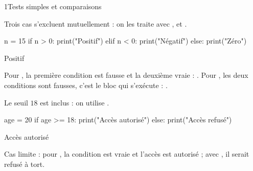 
\corrigesSouples

\begin{corrige}{1}{Tests simples et comparaisons}
\begin{questions}
  \item Trois cas s'excluent mutuellement : on les traite avec ,  et .
\begin{codecote}
\begin{pythoncol}
n = 15
if n > 0:
    print("Positif")
elif n < 0:
    print("Négatif")
else:
    print("Zéro")
\end{pythoncol}
\cote
\begin{consolecol}
Positif
\end{consolecol}
\end{codecote}
    Pour , la première condition est fausse et la deuxième vraie : . Pour , les deux conditions
    sont fausses, c'est le bloc  qui s'exécute : .
  \item Le seuil $18$ est inclus : on utilise \code{>=}.
\begin{codecote}
\begin{pythoncol}
age = 20
if age >= 18:
    print("Accès autorisé")
else:
    print("Accès refusé")
\end{pythoncol}
\cote
\begin{consolecol}
Accès autorisé
\end{consolecol}
\end{codecote}
    Cas limite : pour , la condition  est vraie et l'accès est autorisé ; avec , il serait
    refusé à tort.
\end{questions}
\end{corrige}

